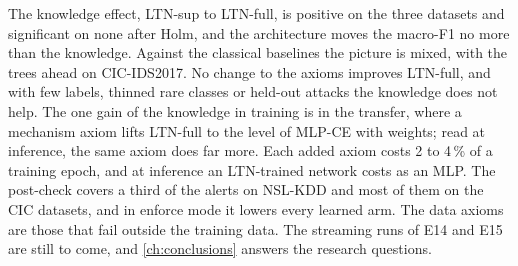 The knowledge effect, LTN-sup to LTN-full, is positive on the three datasets and significant on none after Holm, and the
architecture moves the macro-F1 no more than the knowledge. Against the classical baselines the picture is mixed, with the
trees ahead on CIC-IDS2017. No change to the axioms improves LTN-full, and with few labels, thinned rare classes or held-out
attacks the knowledge does not help. The one gain of the knowledge in training is in the transfer, where a mechanism axiom
lifts LTN-full to the level of MLP-CE with weights; read at inference, the same axiom does far more. Each added axiom costs 2
to 4\,\% of a training epoch, and at inference an LTN-trained network costs as an MLP. The post-check covers a third of the
alerts on NSL-KDD and most of them on the CIC datasets, and in enforce mode it lowers every learned arm. The data axioms are
those that fail outside the training data. The streaming runs of E14 and E15 are still to come, and \cref{ch:conclusions}
answers the research questions.
